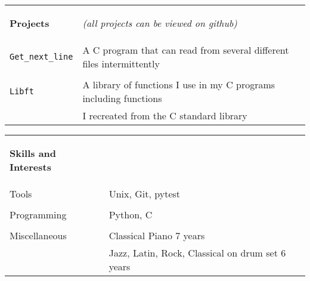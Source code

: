 \documentclass{article}
\begin{document}
\medskip

\begin{tabular}{ m{16em} l }
    {\begin{large} \textbf{Projects} \end{large}} & \textit{(all projects can be viewed on github)} \\
    \verb!Get_next_line! &  A C program that can read from several different files intermittently \\
     & \\
    \verb!Libft! & A library of functions I use in my C programs including functions \\
     & I recreated from the C standard library \\
\end{tabular}

\medskip

\begin{tabular}{ m{16em} l }
    {\begin{large} \textbf{Skills and Interests} \end{large}} & \\
    Tools &  Unix, Git, pytest \\
     & \\
    Programming & Python, C \\
     & \\
    Miscellaneous & Classical Piano 7 years \\
     & Jazz, Latin, Rock, Classical on drum set 6 years \\
\end{tabular}
\end{document}
